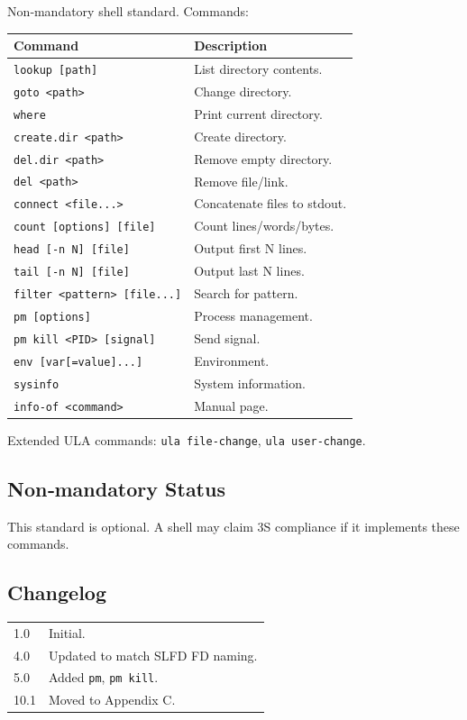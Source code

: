 \documentclass[12pt,a4paper]{article}
\begin{document}
Non‑mandatory shell standard. Commands:
\begin{longtable}{|l|p{}|}
\hline
\textbf{Command} & \textbf{Description} \\
\hline
\texttt{lookup [path]} & List directory contents. \\
\texttt{goto <path>} & Change directory. \\
\texttt{where} & Print current directory. \\
\texttt{create.dir <path>} & Create directory. \\
\texttt{del.dir <path>} & Remove empty directory. \\
\texttt{del <path>} & Remove file/link. \\
\texttt{connect <file...>} & Concatenate files to stdout. \\
\texttt{count [options] [file]} & Count lines/words/bytes. \\
\texttt{head [-n N] [file]} & Output first N lines. \\
\texttt{tail [-n N] [file]} & Output last N lines. \\
\texttt{filter <pattern> [file...]} & Search for pattern. \\
\texttt{pm [options]} & Process management. \\
\texttt{pm kill <PID> [signal]} & Send signal. \\
\texttt{env [var[=value]...]} & Environment. \\
\texttt{sysinfo} & System information. \\
\texttt{info-of <command>} & Manual page. \\
\hline
\end{longtable}

Extended ULA commands: \texttt{ula file-change}, \texttt{ula user-change}.

\subsection{Non‑mandatory Status}
This standard is optional. A shell may claim 3S compliance if it implements these commands.

\subsection{Changelog}
\begin{tabularx}{\textwidth}{|l|X|}
\hline
1.0 & Initial. \\
4.0 & Updated to match SLFD FD naming. \\
5.0 & Added \texttt{pm}, \texttt{pm kill}. \\
10.1 & Moved to Appendix C. \\
\hline
\end{tabularx}
\end{document}
